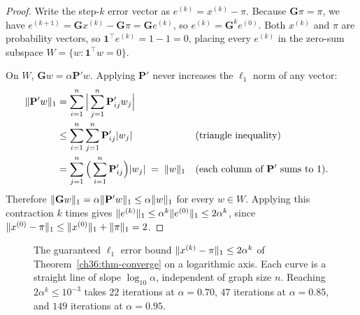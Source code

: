 \begin{proof}
Write the step-$k$ error vector as $e^{(k)} = x^{(k)} - \pi$. Because $\mathbf{G}\pi = \pi$, we have $e^{(k+1)} = \mathbf{G}x^{(k)} - \mathbf{G}\pi = \mathbf{G}e^{(k)}$, so $e^{(k)} = \mathbf{G}^k e^{(0)}$. Both $x^{(k)}$ and $\pi$ are probability vectors, so $\mathbf{1}^\top e^{(k)} = 1 - 1 = 0$, placing every $e^{(k)}$ in the zero-sum subspace $W = \{w : \mathbf{1}^\top w = 0\}$.

On $W$, $\mathbf{G}w = \alpha\mathbf{P}'w$. Applying $\mathbf{P}'$ never increases the $\ell_1$ norm of any vector:
\begin{align*}
  \lVert\mathbf{P}'w\rVert_1
  &= \sum_{i=1}^n \Big\lvert\sum_{j=1}^n \mathbf{P}'_{ij} w_j\Big\rvert \\
  &\le \sum_{i=1}^n \sum_{j=1}^n \mathbf{P}'_{ij}\lvert w_j\rvert && \text{(triangle inequality)} \\
  &= \sum_{j=1}^n \Big(\sum_{i=1}^n \mathbf{P}'_{ij}\Big)\lvert w_j\rvert \;=\; \lVert w\rVert_1 && \text{(each column of $\mathbf{P}'$ sums to $1$).}
\end{align*}
Therefore $\lVert\mathbf{G}w\rVert_1 = \alpha\lVert\mathbf{P}'w\rVert_1 \le \alpha\lVert w\rVert_1$ for every $w \in W$. Applying this contraction $k$ times gives $\lVert e^{(k)}\rVert_1 \le \alpha^k \lVert e^{(0)}\rVert_1 \le 2\alpha^k$, since $\lVert x^{(0)}-\pi\rVert_1 \le \lVert x^{(0)}\rVert_1 + \lVert\pi\rVert_1 = 2$.
\end{proof}

\begin{figure}[htbp]
\centering
{}
\caption{The guaranteed $\ell_1$ error bound $\lVert x^{(k)}-\pi\rVert_1 \le 2\alpha^k$ of Theorem~\ref{ch36:thm-converge} on a logarithmic axis. Each curve is a straight line of slope $\log_{10}\alpha$, independent of graph size $n$. Reaching $2\alpha^k \le 10^{-3}$ takes $22$ iterations at $\alpha=0.70$, $47$ iterations at $\alpha=0.85$, and $149$ iterations at $\alpha=0.95$.}
\label{ch36:fig-converge}
\end{figure}

